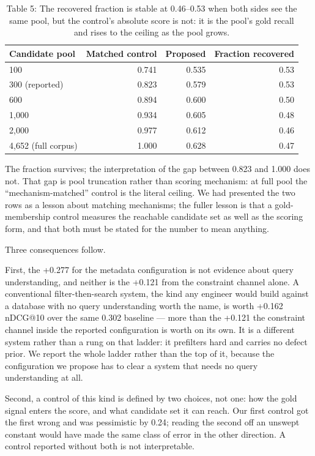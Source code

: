 \documentclass[runningheads]{llncs}
\begin{document}
\begin{table}[t]
\centering
\small
\caption{Table 5: The recovered fraction is stable at 0.46--0.53 when both sides see the same pool, but the control's absolute score is not: it is the pool's gold recall and rises to the ceiling as the pool grows.}
\begin{tabular}{lrrr}
\toprule
Candidate pool & Matched control & Proposed & Fraction recovered \\
\midrule
100 & 0.741 & 0.535 & 0.53 \\
300 (reported) & 0.823 & 0.579 & 0.53 \\
600 & 0.894 & 0.600 & 0.50 \\
1,000 & 0.934 & 0.605 & 0.48 \\
2,000 & 0.977 & 0.612 & 0.46 \\
4,652 (full corpus) & 1.000 & 0.628 & 0.47 \\
\bottomrule
\end{tabular}
\end{table}

The fraction survives; the interpretation of the gap between 0.823 and 1.000 does not. That gap is pool truncation rather than scoring mechanism: at full pool the ``mechanism-matched'' control is the literal ceiling. We had presented the two rows as a lesson about matching mechanisms; the fuller lesson is that a gold-membership control measures the reachable candidate set as well as the scoring form, and that both must be stated for the number to mean anything.

Three consequences follow.

First, the +0.277 for the metadata configuration is not evidence about query understanding, and neither is the +0.121 from the constraint channel alone. A conventional filter-then-search system, the kind any engineer would build against a database with no query understanding worth the name, is worth +0.162 nDCG@10 over the same 0.302 baseline --- more than the +0.121 the constraint channel inside the reported configuration is worth on its own. It is a different system rather than a rung on that ladder: it prefilters hard and carries no defect prior. We report the whole ladder rather than the top of it, because the configuration we propose has to clear a system that needs no query understanding at all.

Second, a control of this kind is defined by two choices, not one: how the gold signal enters the score, and what candidate set it can reach. Our first control got the first wrong and was pessimistic by 0.24; reading the second off an unswept constant would have made the same class of error in the other direction. A control reported without both is not interpretable.
\end{document}
